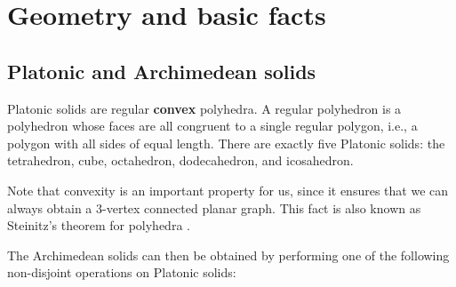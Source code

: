 \chapter{Geometry and basic facts}

\section{Platonic and Archimedean solids}

Platonic solids are regular \textbf{convex} polyhedra. A regular polyhedron is a polyhedron whose faces are all congruent to a single regular polygon, i.e., a polygon with all sides of equal length. There are exactly five Platonic solids: the tetrahedron, cube, octahedron, dodecahedron, and icosahedron.

Note that convexity is an important property for us, since it ensures that we can always obtain a 3-vertex connected planar graph. This fact is also known as Steinitz’s theorem for polyhedra \cite{kendall24}.

The Archimedean solids can then be obtained by performing one of the following non-disjoint operations on Platonic solids:

